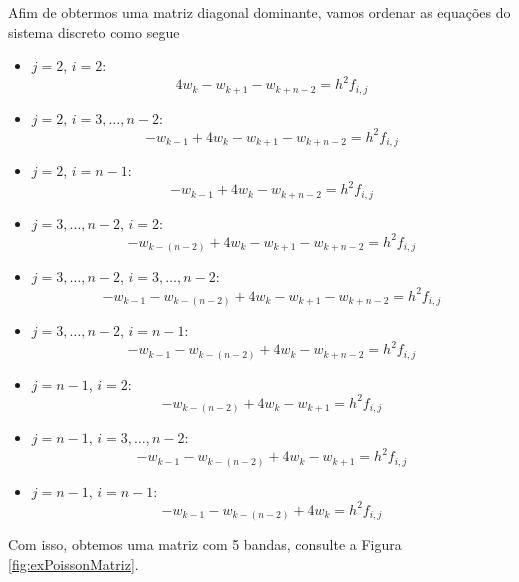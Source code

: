 \begin{ex}
  Afim de obtermos uma matriz diagonal dominante, vamos ordenar as equações do sistema discreto como segue
  \begin{itemize}
  \item $j=2$, $i=2$:
    \begin{equation}
      4w_k - w_{k+1} - w_{k+n-2} = h^2f_{i,j}
    \end{equation}
  \item $j=2$, $i=3,\dotsc,n-2$:
    \begin{equation}
      -w_{k-1} + 4w_{k} - w_{k+1} - w_{k+n-2} = h^2f_{i,j}
    \end{equation}
  \item $j=2$, $i=n-1$:
    \begin{equation}
      -w_{k-1} + 4w_k - w_{k+n-2} = h^2f_{i,j}
    \end{equation}
  \item $j=3,\dotsc,n-2$, $i=2$:
    \begin{equation}
      -w_{k-(n-2)} + 4w_k - w_{k+1} - w_{k+n-2} = h^2f_{i,j}
    \end{equation}
  \item $j=3,\dotsc,n-2$, $i=3,\dotsc,n-2$:
    \begin{equation}
      -w_{k-1} - w_{k-(n-2)} + 4w_k - w_{k+1} - w_{k+n-2} = h^2f_{i,j}
    \end{equation}
  \item $j=3,\dotsc,n-2$, $i=n-1$:
    \begin{equation}
      -w_{k-1} - w_{k-(n-2)} + 4w_k - w_{k+n-2} = h^2f_{i,j} 
    \end{equation}
  \item $j=n-1$, $i=2$:
    \begin{equation}
      -w_{k-(n-2)} + 4w_k - w_{k+1} = h^2f_{i,j}
    \end{equation}
  \item $j=n-1$, $i=3,\dotsc,n-2$:
    \begin{equation}
      -w_{k-1} - w_{k-(n-2)} + 4w_k - w_{k+1} = h^2f_{i,j}
    \end{equation}
  \item $j=n-1$, $i=n-1$:
    \begin{equation}
      -w_{k-1} - w_{k-(n-2)} + 4w_k = h^2f_{i,j}
    \end{equation}
  \end{itemize}
  Com isso, obtemos uma matriz com 5 bandas, consulte a Figura \ref{fig:exPoissonMatriz}.


\end{ex}
